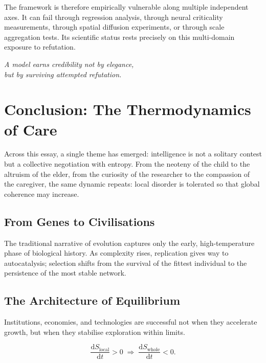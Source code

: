 \documentclass[12pt,a4paper]{article}
\theoremstyle{definition}
\newcommand{\ddt}[1]{\frac{\mathrm{d}#1}{\mathrm{d}t}}
\begin{document}
The framework is therefore empirically vulnerable along multiple independent
axes.  It can fail through regression analysis, through neural criticality
measurements, through spatial diffusion experiments, or through scale
aggregation tests.  Its scientific status rests precisely on this
multi-domain exposure to refutation.

\medskip
\begin{center}
  \itshape
  A model earns credibility not by elegance,\\
  but by surviving attempted refutation.
\end{center}


\section{Conclusion: The Thermodynamics of Care}

Across this essay, a single theme has emerged: intelligence is not a solitary
contest but a collective negotiation with entropy.  From the neoteny of the
child to the altruism of the elder, from the curiosity of the researcher to
the compassion of the caregiver, the same dynamic repeats: local disorder is
tolerated so that global coherence may increase.

\subsection{From Genes to Civilisations}

The traditional narrative of evolution captures only the early, high-temperature
phase of biological history.  As complexity rises, replication gives way to
autocatalysis; selection shifts from the survival of the fittest individual to
the persistence of the most stable network.

\subsection{The Architecture of Equilibrium}

Institutions, economies, and technologies are successful not when they
accelerate growth, but when they stabilise exploration within limits.

\begin{equation}
  \ddt{S_{\mathrm{local}}} > 0
  \;\Longrightarrow\;
  \ddt{S_{\mathrm{whole}}} < 0.
\end{equation}
\end{document}
